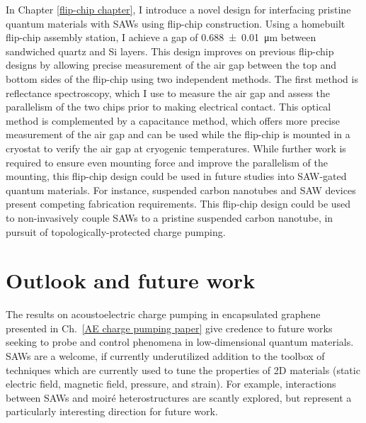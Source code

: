 \documentclass[double,12pt,1in,seploa]{beavtex}
\let\Oldsection\section
\renewcommand{\section}{\FloatBarrier\Oldsection}
\begin{document}
In Chapter \ref{flip-chip chapter}, I introduce a novel design for interfacing pristine quantum materials with SAWs using flip-chip construction. Using a homebuilt flip-chip assembly station, I achieve a gap of \SI{0.688(10)}{\micro\meter} between sandwiched quartz and Si layers. This design improves on previous flip-chip designs by allowing precise measurement of the air gap between the top and bottom sides of the flip-chip using two independent methods. The first method is reflectance spectroscopy, which I use to measure the air gap and assess the parallelism of the two chips prior to making electrical contact. This optical method is complemented by a capacitance method, which offers more precise measurement of the air gap and can be used while the flip-chip is mounted in a cryostat to verify the air gap at cryogenic temperatures. While further work is required to ensure even mounting force and improve the parallelism of the mounting, this flip-chip design could be used in future studies into SAW-gated quantum materials. For instance, suspended carbon nanotubes and SAW devices present competing fabrication requirements. This flip-chip design could be used to non-invasively couple SAWs to a pristine suspended carbon nanotube, in pursuit of topologically-protected charge pumping.





\section{Outlook and future work} \label{outlook and future work}
The results on acoustoelectric charge pumping in encapsulated graphene presented in Ch.\ \ref{AE charge pumping paper} give credence to future works seeking to probe and control phenomena in low-dimensional quantum materials. SAWs are a welcome, if currently underutilized addition to the toolbox of techniques which are currently used to tune the properties of 2D materials (static electric field, magnetic field, pressure, and strain). For example, interactions between SAWs and moiré heterostructures are scantly explored, but represent a particularly interesting direction for future work. 
\end{document}
